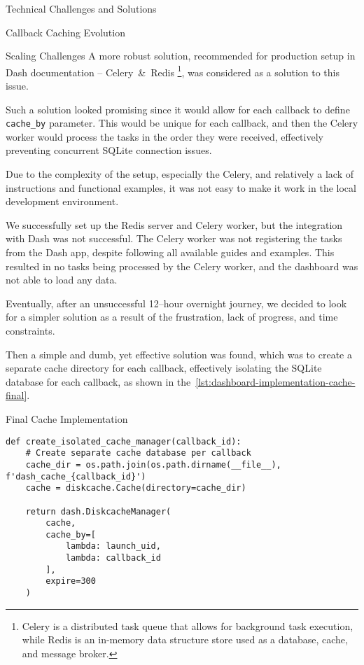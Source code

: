 \begin{section}{Technical Challenges and Solutions}
\begin{subsection}{Callback Caching Evolution}
\begin{subsubsection}{Scaling Challenges}
			A more robust solution, recommended for production setup in Dash documentation – Celery~\&~Redis
			\footnote{Celery is a distributed task queue that allows for background task execution, while Redis is an in-memory data structure store used as a database, cache, and message broker\cite{reintech_blog_combining_celery_redis_caching_task_queuing}\cite{celery_getting_started_introduction}\cite{redis_latest}.},
			was considered as a solution to this issue.

			Such a solution looked promising since it would allow for each callback to define \texttt{cache\_by} parameter.
			This would be unique for each callback, and then the Celery worker would process the tasks in the order they were received, effectively preventing concurrent SQLite connection issues.

			Due to the complexity of the setup, especially the Celery, and relatively a lack of instructions and functional examples, it was not easy to make it work in the local development environment.

			We successfully set up the Redis server and Celery worker, but the integration with Dash was not successful.
			The Celery worker was not registering the tasks from the Dash app, despite following all available guides and examples.
			This resulted in no tasks being processed by the Celery worker, and the dashboard was not able to load any data.

			Eventually, after an unsuccessful 12–hour overnight journey, we decided to look for a simpler solution as a result of the frustration, lack of progress, and time constraints.

			Then a simple and dumb, yet effective solution was found, which was to create a separate cache directory for each callback,
			effectively isolating the SQLite database for each callback, as shown in the~\autoref{lst:dashboard-implementation-cache-final}.

			\pagebreak[4]

			\begin{listing}[H]
				\caption{Final Cache Implementation}
				\begin{verbatim}
def create_isolated_cache_manager(callback_id):
    # Create separate cache database per callback
    cache_dir = os.path.join(os.path.dirname(__file__), f'dash_cache_{callback_id}')
    cache = diskcache.Cache(directory=cache_dir)

    return dash.DiskcacheManager(
        cache,
        cache_by=[
            lambda: launch_uid,
            lambda: callback_id
        ],
        expire=300
    )
				\end{verbatim}
				\label{lst:dashboard-implementation-cache-final}
			\end{listing}


\end{subsubsection}
\end{subsection}
\end{section}
